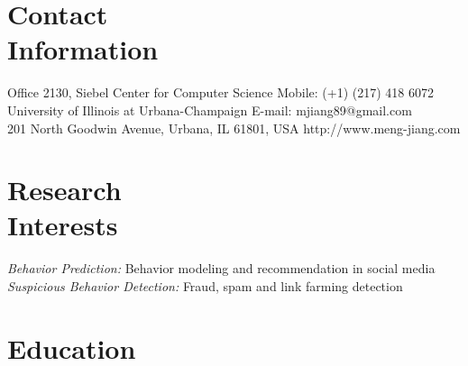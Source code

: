 \documentclass[margin, 10pt]{res} %
\begin{document}
\begin{resume}


\section{Contact \\ Information}

{Office 2130, Siebel Center for Computer Science} \hfill {Mobile:} {(+1) (217) 418 6072} \\
{University of Illinois at Urbana-Champaign} \hfill {E-mail:} {mjiang89@gmail.com} \\
{201 North Goodwin Avenue, Urbana, IL 61801, USA} \hfill {http://www.meng-jiang.com}


\section{Research \\ Interests}

{\em Behavior Prediction:} Behavior modeling and recommendation in social media \\
{\em Suspicious Behavior Detection:} Fraud, spam and link farming detection


\section{Education}


\end{resume}
\end{document}
